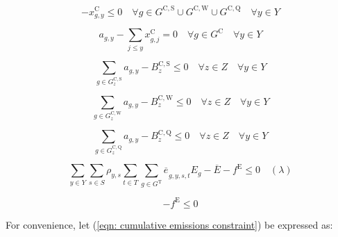 \documentclass{article}
\newcommand{\sGeneratorsCandidate}{G^{\mathrm{C}}}
\newcommand{\sGeneratorsCandidateWind}{G^{\mathrm{C,W}}}
\newcommand{\sGeneratorsCandidateSolar}{G^{\mathrm{C,S}}}
\newcommand{\sGeneratorsThermal}{G^{\mathrm{T}}}
\newcommand{\sStorageCandidate}{G^{\mathrm{C,Q}}}
\newcommand{\sYears}{Y}
\newcommand{\sScenarios}{S}
\newcommand{\sIntervals}{T}
\newcommand{\sZones}{Z}
\newcommand{\iGenerator}{g}
\newcommand{\iYear}{y}
\newcommand{\iYearAlias}{j}
\newcommand{\iScenario}{s}
\newcommand{\iInterval}{t}
\newcommand{\iZone}{z}
\newcommand{\cScenarioDuration}[1][\iYear,\iScenario]{\rho_{#1}}
\newcommand{\cEmissionsIntensity}[1][\iGenerator]{E_{#1}}
\newcommand{\cBuildLimit}[1][]{B^{\mathrm{C,#1}}_{\iZone}}
\newcommand{\cEmmissionsCumulativeTarget}{\overline{E}}
\newcommand{\vEnergy}[1][\iGenerator,\iYear,\iScenario,\iInterval]{e_{#1}}
\newcommand{\vInstalledCapacity}[1][\iGenerator,\iYear]{x^{\mathrm{C}}_{#1}}
\newcommand{\vEmissionsTargetViolation}{f^{\mathrm{E}}}
\newcommand{\vInstalledCapacityTotal}[1][\iGenerator,\iYear]{a_{#1}}
\begin{document}
\begin{equation}
- \vInstalledCapacity[\iGenerator,\iYear] \leq 0 \quad \forall \iGenerator \in \sGeneratorsCandidateSolar \cup \sGeneratorsCandidateWind \cup \sStorageCandidate \quad \forall \iYear \in \sYears
\end{equation}

\begin{equation}
\vInstalledCapacityTotal - \sum\limits_{\iYearAlias \leq \iYear} \vInstalledCapacity[\iGenerator,\iYearAlias] = 0 \quad \forall \iGenerator \in \sGeneratorsCandidate \quad \forall \iYear \in \sYears
\end{equation}

\begin{equation}
\sum\limits_{\iGenerator \in \sGeneratorsCandidateSolar_{\iZone}} \vInstalledCapacityTotal - \cBuildLimit[S] \leq 0 \quad \forall \iZone \in \sZones \quad \forall \iYear \in \sYears
\end{equation}

\begin{equation}
\sum\limits_{\iGenerator \in \sGeneratorsCandidateWind_{\iZone}} \vInstalledCapacityTotal - \cBuildLimit[W] \leq 0 \quad \forall \iZone \in \sZones \quad \forall \iYear \in \sYears 
\end{equation}

\begin{equation}
\sum\limits_{\iGenerator \in \sStorageCandidate_{\iZone}} \vInstalledCapacityTotal - \cBuildLimit[Q] \leq 0  \quad \forall \iZone \in \sZones \quad \forall \iYear \in \sYears
\end{equation}

\begin{equation}
\sum\limits_{\iYear \in \sYears} \sum\limits_{\iScenario \in \sScenarios} \cScenarioDuration \sum\limits_{\iInterval \in \sIntervals} \sum\limits_{\iGenerator \in \sGeneratorsThermal} \overline{\vEnergy[]}_{\iGenerator,\iYear,\iScenario,\iInterval} \cEmissionsIntensity - \cEmmissionsCumulativeTarget - \vEmissionsTargetViolation \leq 0 \quad (\lambda)
	\label{eqn: cumulative emissions constraint}
\end{equation}

\begin{equation}
	- \vEmissionsTargetViolation \leq 0
	\label{eqn: non-negative emissions constraint violation}
\end{equation}

For convenience, let (\ref{eqn: cumulative emissions constraint}) be expressed as:
\end{document}
